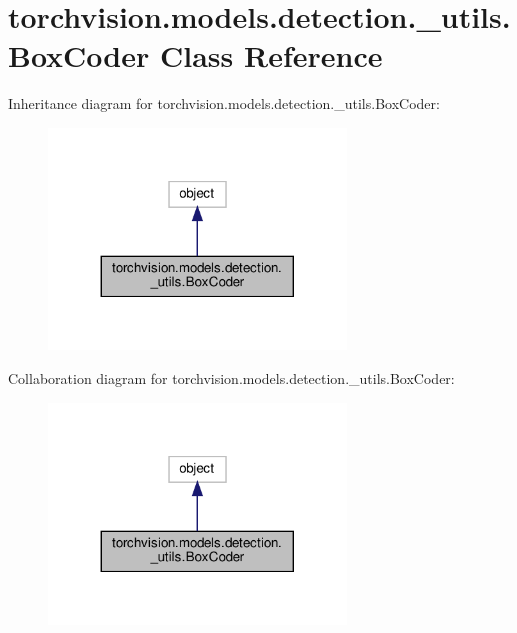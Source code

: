 \hypertarget{classtorchvision_1_1models_1_1detection_1_1__utils_1_1BoxCoder}{}\section{torchvision.\+models.\+detection.\+\_\+utils.\+Box\+Coder Class Reference}
\label{classtorchvision_1_1models_1_1detection_1_1__utils_1_1BoxCoder}


Inheritance diagram for torchvision.\+models.\+detection.\+\_\+utils.\+Box\+Coder\+:
\nopagebreak
\begin{figure}[H]
\begin{center}
\leavevmode
\includegraphics[width=224pt]{classtorchvision_1_1models_1_1detection_1_1__utils_1_1BoxCoder__inherit__graph}
\end{center}
\end{figure}


Collaboration diagram for torchvision.\+models.\+detection.\+\_\+utils.\+Box\+Coder\+:
\nopagebreak
\begin{figure}[H]
\begin{center}
\leavevmode
\includegraphics[width=224pt]{classtorchvision_1_1models_1_1detection_1_1__utils_1_1BoxCoder__coll__graph}
\end{center}
\end{figure}
